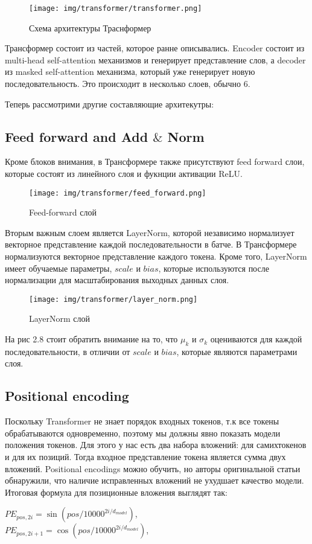 \documentclass[PMI,KR]{HSEUniversity}
\begin{document}
\begin{figure}[h]
    \centering
    \texttt{[image: img/transformer/transformer.png]}
    \caption{Схема архитектуры Траснформер}
\end{figure}

Трансформер состоит из частей, которое ранне описывались. Encoder состоит из multi-head self-attention механизмов и генерирует представление слов, а decoder из masked self-attention механизма, который уже генерирует новую последовательность. Это происходит в несколько слоев, обычно 6.

Теперь рассмотрими другие составляющие архитекутры:\\


\subsection{Feed forward and Add $\&$ Norm} 

Кроме блоков внимания, в Трансформере также присутствуют feed forward слои, которые состоят из линейного слоя и фукнции активации ReLU.

\begin{figure}[h]
    \centering
    \texttt{[image: img/transformer/feed\_forward.png]}
    \caption{Feed-forward слой}
\end{figure}

Вторым важным слоем является LayerNorm, которой независимо нормализует векторное представление каждой последовательности в батче. В Трансформере нормализуются векторное представление каждого токена. Кроме того, LayerNorm имеет обучаемые параметры, $scale$ и $bias$, которые используются после нормализации для масштабирования выходных данных слоя.

\begin{figure}[h]
    \centering
    \texttt{[image: img/transformer/layer\_norm.png]}
    \caption{LayerNorm слой}
\end{figure}

 На рис 2.8 стоит обратить внимание на то, что $\mu_{k}$ и $\sigma_{k}$ оцениваются для каждой последовательности, в отличии от $scale$ и $bias$, которые являются параметрами слоя.


\subsection{Positional encoding} 

Поскольку Transformer не знает порядок входных токенов, т.к все токены обрабатываются одновременно, поэтому мы должны явно показать модели положения токенов. Для этого у нас есть два набора вложений: для самихтокенов и для их позиций. Тогда входное представление токена является сумма двух вложений.
Positional encodings можно обучить, но авторы оригинальной статьи обнаружили, что наличие исправленных вложений не ухудшает качество модели. Итоговая формула для позиционные вложения выглядят так:
\begin{center}
$PE_{pos,2i} = \sin(pos/10000^{2i/d_{model}})$, \\
$PE_{pos,2i+1} = \cos(pos/10000^{2i/d_{model}})$, \\
\end{center}
\end{document}
